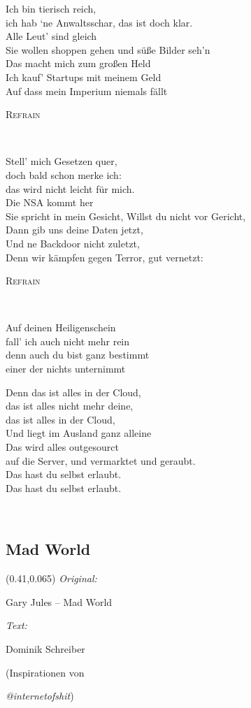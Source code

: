 \documentclass[11pt,a5paper]{article}
\makeatletter
\newcommand\chordcolor{blue}
\newcommand\chord[2][l]{\makebox[0pt][#1]{\begin{tabular}[b]{@{}l@{}}\textcolor{\chordcolor}{#2}\\\mbox{}\end{tabular}}}
\newcommand\refrain[1]{\begin{tcolorbox}#1\end{tcolorbox} \ }
\newcommand{\refrefrain}{\refrain{\textsc{Refrain}} \ }
\newcommand\songinfo[2]{\begin{textblock}{0.5}(0.41,0.065)
		\footnotesize 
		\hfill \textit{Original:} \ \ \ \ \ \ \ \ \ \ \ \ \ \ \ \ \ \ \ \ 
		
		\hfill #1
		
		\hfill  \textit{Text:} \ \ \ \ \ \ \ \ \ \ \ \ \ \ \ \ \ \ \ \ 
		
		\hfill #2
	\end{textblock}}
\makeatother
\begin{document}
Ich bin tierisch reich, \\
ich hab ‘ne Anwaltsschar, das ist doch klar. \\
Alle Leut’ sind gleich \\
Sie wollen shoppen gehen und süße Bilder seh’n \\
Das macht mich zum großen Held \\
Ich kauf’ Startups mit meinem Geld \\
Auf dass mein Imperium niemals fällt \\

\refrefrain

Stell’ mich Gesetzen quer, \\
doch bald schon merke ich: \\
das wird nicht leicht für mich. \\
Die NSA kommt her \\
Sie spricht in mein Gesicht, \glqq Willst du nicht vor Gericht, \\
Dann gib uns deine Daten jetzt, \\
Und ne Backdoor nicht zuletzt, \\
Denn wir kämpfen gegen Terror, gut vernetzt:\grqq \\

\refrefrain

\chord{e} Auf deinen Heiligenschein \\
fall’ ich auch nicht mehr \chord{C}rein \\
\chord{e} denn auch du bist ganz bestimmt \\
einer der nichts unter\chord{H}nimmt \\

\refrain{
Denn das ist alles in der Cloud, \\
das ist alles nicht mehr deine, \\
das ist alles in der Cloud, \\
Und liegt im Ausland ganz alleine \\
Das wird alles outgesourct \\
auf die Server, und vermarktet und geraubt. \\
Das hast du selbst erlaubt. \\
Das hast du selbst erlaubt.}

\pagebreak

\subsection{Mad World}
\songinfo{Gary Jules – Mad World}{Dominik Schreiber
	
	\hfill(Inspirationen von 
	
	\hfill \textit{@internetofshit})}
\end{document}
